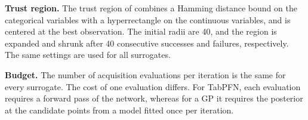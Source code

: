 \textbf{Trust region.} The trust region of  combines a Hamming distance bound on the categorical variables with a hyperrectangle on the continuous variables, and is centered at the best observation. The initial radii are 40, and the region is expanded and shrunk after 40 consecutive successes and failures, respectively. The same settings are used for all surrogates.

\textbf{Budget.} The number of acquisition evaluations per iteration is the same for every surrogate. The cost of one evaluation differs. For TabPFN, each evaluation requires a forward pass of the network, whereas for a GP it requires the posterior at the candidate points from a model fitted once per iteration. %





